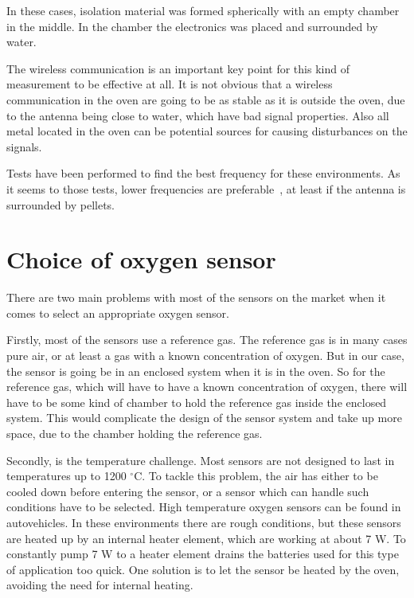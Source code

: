In these cases, isolation material was formed spherically with an empty chamber in the middle. In the chamber the electronics was placed and surrounded by water.


The wireless communication is an important key point for this kind of measurement to be effective at all. It is not obvious that a wireless communication in the oven are going to be as stable as it is outside the oven, due to the antenna being close to water, which have bad signal properties. Also all metal located in the oven can be potential sources for causing disturbances on the signals.


Tests have been performed to find the best frequency for these environments. As it seems to those tests, lower frequencies are preferable~\cite{DISIRE2}, at least if the antenna is surrounded by pellets.


\section{Choice of oxygen sensor}

There are two main problems with most of the sensors on the market when it comes to select an appropriate oxygen sensor. 

Firstly, most of the sensors use a reference gas. The reference gas is in many cases pure air, or at least a gas with a known concentration of oxygen. But in our case, the sensor is going be in an enclosed system when it is in the oven. So for the reference gas, which will have to have a known concentration of oxygen, there will have to be some kind of chamber to hold the reference gas inside the enclosed system. This would complicate the design of the sensor system and take up more space, due to the chamber holding the reference gas.


Secondly, is the temperature challenge. Most sensors are not designed to last in temperatures up to 1200 $^\circ$C. To tackle this problem, the air has either to be cooled down before entering the sensor, or a sensor which can handle such conditions have to be selected. High temperature oxygen sensors can be found in autovehicles. In these environments there are rough conditions, but these sensors are heated up by an internal heater element, which are working at about 7 W. To constantly pump 7 W to a heater element drains the batteries used for this type of application too quick. One solution is to let the sensor be heated by the oven, avoiding the need for internal heating.


